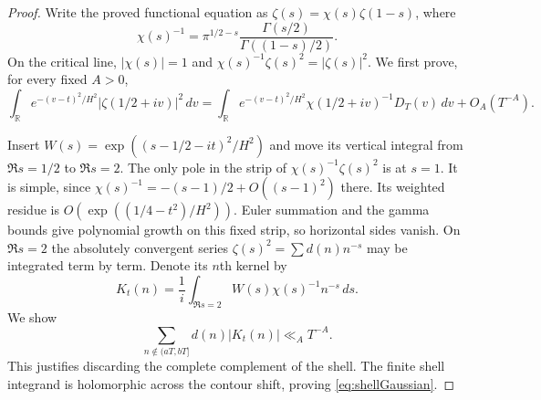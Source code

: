 \begin{proof}
Write the proved functional equation as
$\zeta(s)=\chi(s)\zeta(1-s)$, where
\[
 \chi(s)^{-1}=\pi^{1/2-s}
             \frac{\Gamma(s/2)}{\Gamma((1-s)/2)}.
\]
On the critical line, $|\chi(s)|=1$ and
$\chi(s)^{-1}\zeta(s)^2=|\zeta(s)|^2$.
We first prove, for every fixed $A>0$,
\begin{equation}\label{eq:shellGaussian}
 \int_{\mathbb R}e^{-(v-t)^2/H^2}|\zeta(1/2+iv)|^2\,dv
 =\int_{\mathbb R}e^{-(v-t)^2/H^2}
       \chi(1/2+iv)^{-1}D_T(v)\,dv+O_A(T^{-A}).
\end{equation}

Insert $W(s)=\exp((s-1/2-it)^2/H^2)$ and move its vertical
integral from $\Re s=1/2$ to $\Re s=2$.
The only pole in the strip of $\chi(s)^{-1}\zeta(s)^2$ is at $s=1$.
It is simple, since $\chi(s)^{-1}=-(s-1)/2+O((s-1)^2)$ there.
Its weighted residue is $O(\exp((1/4-t^2)/H^2))$.
Euler summation and the gamma bounds give polynomial growth on this
fixed strip, so horizontal sides vanish. On $\Re s=2$ the absolutely
convergent series $\zeta(s)^2=\sum d(n)n^{-s}$ may be integrated
term by term. Denote its $n$th kernel by
\[
 K_t(n)=\frac1i\int_{\Re s=2}W(s)\chi(s)^{-1}n^{-s}\,ds.
\]
We show
\begin{equation}\label{eq:shelltail}
 \sum_{n\notin(aT,bT]}d(n)|K_t(n)|\ll_A T^{-A}.
\end{equation}
This justifies discarding the complete complement of the shell.
The finite shell integrand is holomorphic across the contour shift,
proving \eqref{eq:shellGaussian}.


\end{proof}
